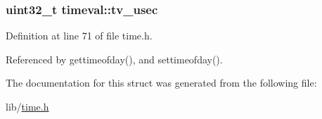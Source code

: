 \subsubsection[{\texorpdfstring{tv\+\_\+usec}{tv_usec}}]{\setlength{\rightskip}{0pt plus 5cm}uint32\+\_\+t timeval\+::tv\+\_\+usec}\hypertarget{structtimeval_a8fd7abf5420981b3ff58bb23df458587}{}\label{structtimeval_a8fd7abf5420981b3ff58bb23df458587}


Definition at line 71 of file time.\+h.



Referenced by gettimeofday(), and settimeofday().



The documentation for this struct was generated from the following file\+:\begin{DoxyCompactItemize}
\item 
lib/\hyperlink{time_8h}{time.\+h}\end{DoxyCompactItemize}
